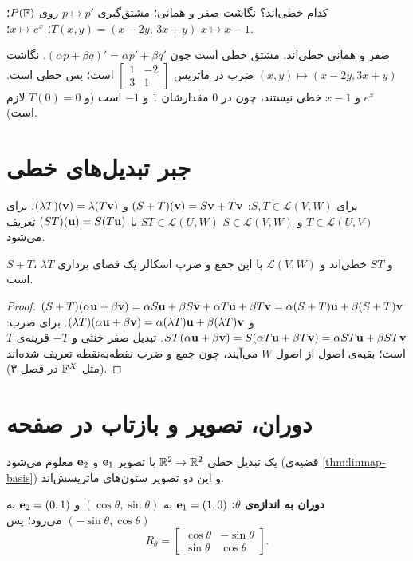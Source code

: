 \begin{example}
کدام خطی‌اند؟ نگاشت صفر و همانی؛ مشتق‌گیری $p\mapsto p'$ روی $P(\mathbb{F})$؛ $T(x,y)=(x-2y,\,3x+y)$؛ $x\mapsto e^x$؛ $x\mapsto x-1$.
\end{example}
\begin{solution}
صفر و همانی خطی‌اند. مشتق خطی است چون $(\alpha p+\beta q)'=\alpha p'+\beta q'$. نگاشت $(x,y)\mapsto(x-2y,3x+y)$ ضرب در ماتریس $\begin{bmatrix}1&-2\\3&1\end{bmatrix}$ است؛ پس خطی است. $e^x$ و $x-1$ خطی نیستند، چون در $0$ مقدارشان $1$ و $-1$ است (و $T(0)=0$ لازم است).
\end{solution}

\section{جبر تبدیل‌های خطی}

برای $S,T\in\mathcal{L}(V,W)$: $(S+T)(\mathbf{v})=S\mathbf{v}+T\mathbf{v}$ و $(\lambda T)(\mathbf{v})=\lambda(T\mathbf{v})$. برای $T\in\mathcal{L}(U,V)$ و $S\in\mathcal{L}(V,W)$  $ST\in\mathcal{L}(U,W)$ با $(ST)(\mathbf{u})=S(T\mathbf{u})$ تعریف می‌شود.

\begin{theorem}\label{thm:LVW}
$S+T$، $\lambda T$ و $ST$ خطی‌اند و $\mathcal{L}(V,W)$ با این جمع و ضرب اسکالر یک فضای برداری است.
\end{theorem}
\begin{proof}
$(S+T)(\alpha\mathbf{u}+\beta\mathbf{v})=\alpha S\mathbf{u}+\beta S\mathbf{v}+\alpha T\mathbf{u}+\beta T\mathbf{v}=\alpha(S+T)\mathbf{u}+\beta(S+T)\mathbf{v}$ و $(\lambda T)(\alpha\mathbf{u}+\beta\mathbf{v})=\alpha(\lambda T)\mathbf{u}+\beta(\lambda T)\mathbf{v}$. برای ضرب: $ST(\alpha\mathbf{u}+\beta\mathbf{v})=S(\alpha T\mathbf{u}+\beta T\mathbf{v})=\alpha ST\mathbf{u}+\beta ST\mathbf{v}$. تبدیل صفر خنثی و $-T$ قرینه‌ی $T$ است؛ بقیه‌ی اصول از اصول $W$ می‌آیند، چون جمع و ضرب نقطه‌به‌نقطه تعریف شده‌اند (مثل $\mathbb{F}^X$ در فصل ۳).
\end{proof}

\section{دوران، تصویر و بازتاب در صفحه}

یک تبدیل خطی $\mathbb{R}^2\to\mathbb{R}^2$ با تصویر $\mathbf{e}_1$ و $\mathbf{e}_2$ معلوم می‌شود (قضیه‌ی \ref{thm:linmap-basis}) و این دو تصویر ستون‌های ماتریسش‌اند.

\textbf{دوران  به اندازه‌ی $\theta$:} $\mathbf{e}_1=(1,0)$ به $(\cos\theta,\sin\theta)$ و $\mathbf{e}_2=(0,1)$ به $(-\sin\theta,\cos\theta)$ می‌رود؛ پس
\[
R_\theta=\begin{bmatrix}\cos\theta&-\sin\theta\\ \sin\theta&\cos\theta\end{bmatrix}.
\]

